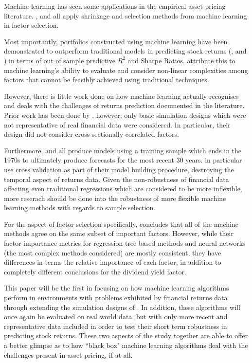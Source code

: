 \documentclass[a4paper, table]{article}
\begin{document}
Machine learning has seen some applications in the empirical asset pricing literature. \cite{kozak_shrinking_2017}, \cite{rapach_forecasting_2013} and \cite{freyberger_dissecting_2017} all apply shrinkage and selection methods from machine learning in factor selection.  

Most importantly, portfolios constructed using machine learning have been demonstrated to outperform traditional models in predicting stock returns (\cite{gu_empirical_2018}, \cite{hsu_finding_2014} and \cite{feng_deep_2018}) in terms of out of sample predictive $R^2$ and Sharpe Ratios. \cite{gu_empirical_2018} attribute this to machine learning's ability to evaluate and consider non-linear complexities among factors that cannot be feasibly achieved using traditional techniques. 

However, there is little work done on how machine learning actually recognises and deals with the challenges of returns prediction documented in the literature. Prior work has been done by \cite{gu_empirical_2018}, however; only basic simulation designs which were not representative of real financial data were considered. In particular, their design did not consider cross sectionally correlated factors.

Furthermore, \cite{feng_deep_2018} and \cite{gu_empirical_2018} all produce models using a training sample which ends in the 1970s to ultimately produce forecasts for the most recent 30 years. \cite{feng_deep_2018} in particular use cross validation as part of their model building procedure, destroying the temporal aspect of returns data. Given the non-robustness of financial data affecting even traditional regressions which are considered to be more inflexible, more reserach should be done into the robustness of more flexible machine learning methods with regards to sample selection.

For the aspect of factor selection specifically, \cite{gu_empirical_2018} concludes that all of the machine methods agree on the same subset of important factors. However, while their factor importance metrics for regression-tree based methods and neural networks (the most complex methods considered) are mostly consistent, they have differences in terms the relative importance of each factor, in addition to completely different conclusions for the dividend yield factor.

This paper will be the first in focusing on how machine learning algorithms perform in environments with problems exhibited by financial returns data through extending the simulation designs of \cite{gu_empirical_2018}. In addition, these algorithms will once again be evaluated on real world data, but with only more recent and representative data included in order to test their short term robustness in predicting stock returns. These two aspects of the study together are able to offer a better glimpse as to how ``black box" machine learning algorithms deal with the challenges present in asset pricing, if at all.
\end{document}
